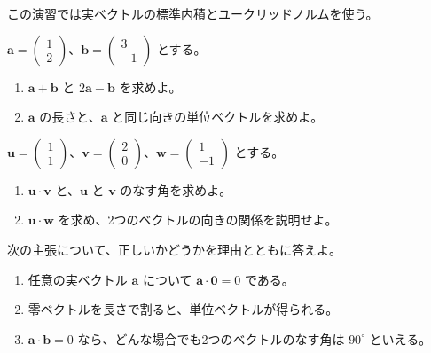 \documentclass[11pt]{article}
\begin{document}
この演習では実ベクトルの標準内積とユークリッドノルムを使う。

\problem[成分の計算と長さ]
$\boldsymbol a=\begin{pmatrix}1\\2\end{pmatrix}$、$\boldsymbol b=\begin{pmatrix}3\\-1\end{pmatrix}$ とする。
\begin{enumerate}[label=(\arabic*)]
\item $\boldsymbol a+\boldsymbol b$ と $2\boldsymbol a-\boldsymbol b$ を求めよ。
\item $\boldsymbol a$ の長さと、$\boldsymbol a$ と同じ向きの単位ベクトルを求めよ。
\end{enumerate}
\workspace{45mm}

\problem[内積の意味]
$\boldsymbol u=\begin{pmatrix}1\\1\end{pmatrix}$、$\boldsymbol v=\begin{pmatrix}2\\0\end{pmatrix}$、$\boldsymbol w=\begin{pmatrix}1\\-1\end{pmatrix}$ とする。
\begin{enumerate}[label=(\arabic*)]
\item $\boldsymbol u\cdot\boldsymbol v$ と、$\boldsymbol u$ と $\boldsymbol v$ のなす角を求めよ。
\item $\boldsymbol u\cdot\boldsymbol w$ を求め、2つのベクトルの向きの関係を説明せよ。
\end{enumerate}
\workspace{45mm}

\newpage
\problem[零ベクトルへの注意]
次の主張について、正しいかどうかを理由とともに答えよ。
\begin{enumerate}[label=(\arabic*)]
\item 任意の実ベクトル $\boldsymbol a$ について $\boldsymbol a\cdot\boldsymbol 0=0$ である。
\item 零ベクトルを長さで割ると、単位ベクトルが得られる。
\item $\boldsymbol a\cdot\boldsymbol b=0$ なら、どんな場合でも2つのベクトルのなす角は $90^\circ$ といえる。
\end{enumerate}
\workspace{50mm}
\end{document}
